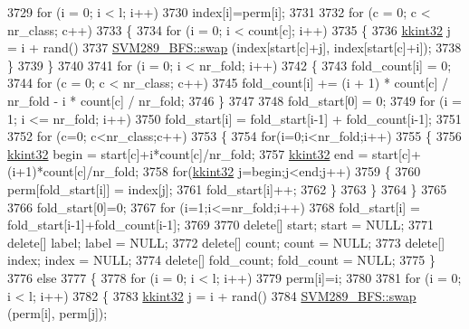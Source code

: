 \begin{DoxyCode}
3729     \textcolor{keywordflow}{for}  (i = 0;  i < l;  i++)
3730       index[i]=perm[i];
3731 
3732     \textcolor{keywordflow}{for} (c = 0;  c < nr\_class;  c++) 
3733     \{
3734       \textcolor{keywordflow}{for}  (i = 0;  i < count[c];  i++)
3735       \{
3736         \hyperlink{namespace_k_k_b_a8fa4952cc84fda1de4bec1fbdd8d5b1b}{kkint32} j = i + rand() %
3737         \hyperlink{namespace_s_v_m289___b_f_s_ab3100b6a2a7917c5fb6ef6aae0af496f}{SVM289\_BFS::swap} (index[start[c]+j], index[start[c]+i]);
3738       \}
3739     \}
3740 
3741     \textcolor{keywordflow}{for}  (i = 0;  i < nr\_fold;  i++)
3742     \{
3743       fold\_count[i] = 0;
3744       \textcolor{keywordflow}{for}  (c = 0;  c < nr\_class;  c++)
3745         fold\_count[i] += (i + 1) * count[c] / nr\_fold - i * count[c] / nr\_fold;
3746     \}
3747 
3748     fold\_start[0] = 0;
3749     \textcolor{keywordflow}{for} (i = 1;  i <= nr\_fold;  i++)
3750       fold\_start[i] = fold\_start[i-1] + fold\_count[i-1];
3751 
3752     \textcolor{keywordflow}{for} (c=0; c<nr\_class;c++)
3753     \{
3754       \textcolor{keywordflow}{for}(i=0;i<nr\_fold;i++)
3755       \{
3756         \hyperlink{namespace_k_k_b_a8fa4952cc84fda1de4bec1fbdd8d5b1b}{kkint32} begin = start[c]+i*count[c]/nr\_fold;
3757         \hyperlink{namespace_k_k_b_a8fa4952cc84fda1de4bec1fbdd8d5b1b}{kkint32} end = start[c]+(i+1)*count[c]/nr\_fold;
3758         \textcolor{keywordflow}{for}(\hyperlink{namespace_k_k_b_a8fa4952cc84fda1de4bec1fbdd8d5b1b}{kkint32} j=begin;j<end;j++)
3759         \{
3760           perm[fold\_start[i]] = index[j];
3761           fold\_start[i]++;
3762         \}
3763       \}
3764     \}
3765 
3766     fold\_start[0]=0;
3767     \textcolor{keywordflow}{for} (i=1;i<=nr\_fold;i++)
3768       fold\_start[i] = fold\_start[i-1]+fold\_count[i-1];
3769 
3770     \textcolor{keyword}{delete}[] start;       start = NULL;
3771     \textcolor{keyword}{delete}[] label;       label = NULL;
3772     \textcolor{keyword}{delete}[] count;       count = NULL;
3773     \textcolor{keyword}{delete}[] index;       index = NULL;
3774     \textcolor{keyword}{delete}[] fold\_count;  fold\_count = NULL;
3775   \}
3776   \textcolor{keywordflow}{else}
3777   \{
3778     \textcolor{keywordflow}{for} (i = 0;  i < l;  i++) 
3779       perm[i]=i;
3780 
3781     \textcolor{keywordflow}{for} (i = 0;  i < l;  i++)
3782     \{
3783       \hyperlink{namespace_k_k_b_a8fa4952cc84fda1de4bec1fbdd8d5b1b}{kkint32} j = i + rand() %
3784       \hyperlink{namespace_s_v_m289___b_f_s_ab3100b6a2a7917c5fb6ef6aae0af496f}{SVM289\_BFS::swap} (perm[i], perm[j]);

\end{DoxyCode}
